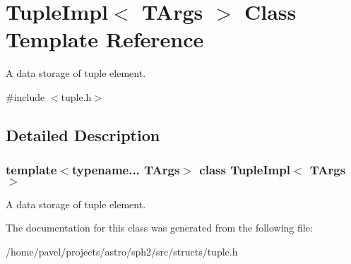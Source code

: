 \hypertarget{classTupleImpl}{}\section{Tuple\+Impl$<$ T\+Args $>$ Class Template Reference}
\label{classTupleImpl}


A data storage of tuple element.  




{\ttfamily \#include $<$tuple.\+h$>$}



\subsection{Detailed Description}
\subsubsection*{template$<$typename... T\+Args$>$\newline
class Tuple\+Impl$<$ T\+Args $>$}

A data storage of tuple element. 

The documentation for this class was generated from the following file\+:\begin{DoxyCompactItemize}
\item 
/home/pavel/projects/astro/sph2/src/structs/tuple.\+h\end{DoxyCompactItemize}
